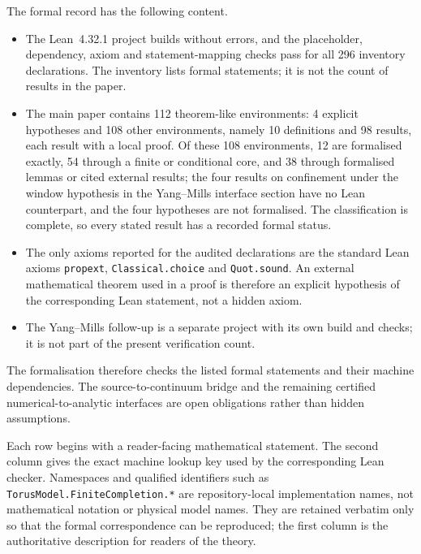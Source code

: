 The formal record has the following content.
\begin{itemize}[leftmargin=*]
\item The Lean~4.32.1 project builds without errors, and the placeholder,
  dependency, axiom and statement-mapping checks pass for all 296 inventory
  declarations.  The inventory lists formal statements; it is not the count of
  results in the paper.
\item The main paper contains 112 theorem-like environments: 4 explicit
  hypotheses and 108 other environments, namely 10 definitions and 98 results,
  each result with a local proof.  Of these 108 environments, 12 are formalised
  exactly, 54 through a finite or conditional core, and 38 through formalised
  lemmas or cited external results; the four results on confinement under
  the window hypothesis in the Yang--Mills interface section have no Lean
  counterpart, and the four hypotheses are not formalised.
  The classification is complete, so every stated result has a recorded formal
  status.
\item The only axioms reported for the audited declarations are the standard
  Lean axioms \texttt{propext}, \texttt{Classical.choice} and
  \texttt{Quot.sound}.  An external mathematical theorem used in a proof is
  therefore an explicit hypothesis of the corresponding Lean statement, not a
  hidden axiom.
\item The Yang--Mills follow-up is a separate project with its own build and
  checks; it is not part of the present verification count.
\end{itemize}
The formalisation therefore checks the listed formal statements and their
machine dependencies.  The source-to-continuum bridge and the remaining
certified numerical-to-analytic interfaces are open obligations rather than
hidden assumptions.

Each row begins with a reader-facing mathematical statement.  The second
column gives the exact machine lookup key used by the corresponding Lean
checker.  Namespaces and qualified identifiers such as
\texttt{TorusModel.FiniteCompletion.*} are repository-local implementation names, not
mathematical notation or physical model names.  They are retained verbatim
only so that the formal correspondence can be reproduced; the first column
is the authoritative description for readers of the theory.

